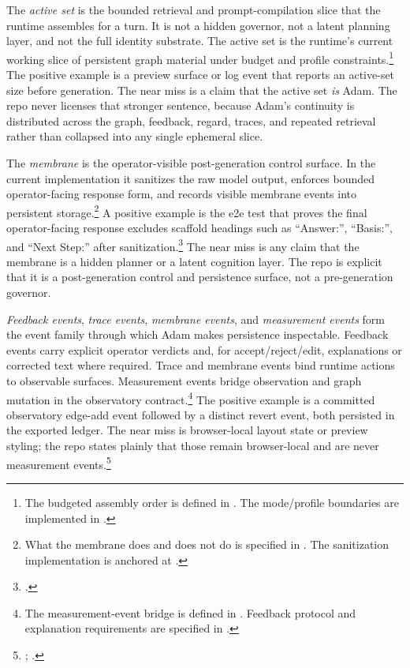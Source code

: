 \documentclass[10pt]{article}
\begin{document}
The \emph{active set} is the bounded retrieval and prompt-compilation slice that the runtime assembles for a turn. It is not a hidden governor, not a latent planning layer, and not the full identity substrate. The active set is the runtime's current working slice of persistent graph material under budget and profile constraints.\footnote{The budgeted assembly order is defined in . The mode/profile boundaries are implemented in .} The positive example is a preview surface or log event that reports an active-set size before generation. The near miss is a claim that the active set \emph{is} Adam. The repo never licenses that stronger sentence, because Adam's continuity is distributed across the graph, feedback, regard, traces, and repeated retrieval rather than collapsed into any single ephemeral slice.

The \emph{membrane} is the operator-visible post-generation control surface. In the current implementation it sanitizes the raw model output, enforces bounded operator-facing response form, and records visible membrane events into persistent storage.\footnote{What the membrane does and does not do is specified in . The sanitization implementation is anchored at .} A positive example is the e2e test that proves the final operator-facing response excludes scaffold headings such as ``Answer:'', ``Basis:'', and ``Next Step:'' after sanitization.\footnote{.} The near miss is any claim that the membrane is a hidden planner or a latent cognition layer. The repo is explicit that it is a post-generation control and persistence surface, not a pre-generation governor.

\emph{Feedback events}, \emph{trace events}, \emph{membrane events}, and \emph{measurement events} form the event family through which Adam makes persistence inspectable. Feedback events carry explicit operator verdicts and, for accept/reject/edit, explanations or corrected text where required. Trace and membrane events bind runtime actions to observable surfaces. Measurement events bridge observation and graph mutation in the observatory contract.\footnote{The measurement-event bridge is defined in . Feedback protocol and explanation requirements are specified in .} The positive example is a committed observatory edge-add event followed by a distinct revert event, both persisted in the exported ledger. The near miss is browser-local layout state or preview styling; the repo states plainly that those remain browser-local and are never measurement events.\footnote{; .}
\end{document}
